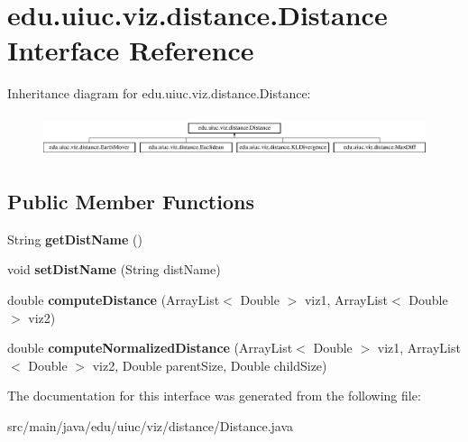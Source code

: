 \hypertarget{interfaceedu_1_1uiuc_1_1viz_1_1distance_1_1_distance}{}\section{edu.\+uiuc.\+viz.\+distance.\+Distance Interface Reference}
\label{interfaceedu_1_1uiuc_1_1viz_1_1distance_1_1_distance}
Inheritance diagram for edu.\+uiuc.\+viz.\+distance.\+Distance\+:\begin{figure}[H]
\begin{center}
\leavevmode
\includegraphics[height=1.244444cm]{interfaceedu_1_1uiuc_1_1viz_1_1distance_1_1_distance}
\end{center}
\end{figure}
\subsection*{Public Member Functions}
\begin{DoxyCompactItemize}
\item 
\mbox{\label{interfaceedu_1_1uiuc_1_1viz_1_1distance_1_1_distance_a31ea5f00d277c4878eed1290e2b740d9}} 
String {\bfseries get\+Dist\+Name} ()
\item 
\mbox{\label{interfaceedu_1_1uiuc_1_1viz_1_1distance_1_1_distance_a518598e720285f309bf28826601439ae}} 
void {\bfseries set\+Dist\+Name} (String dist\+Name)
\item 
\mbox{\label{interfaceedu_1_1uiuc_1_1viz_1_1distance_1_1_distance_a4221df5969873dddb0c7c115c03a1f17}} 
double {\bfseries compute\+Distance} (Array\+List$<$ Double $>$ viz1, Array\+List$<$ Double $>$ viz2)
\item 
\mbox{\label{interfaceedu_1_1uiuc_1_1viz_1_1distance_1_1_distance_a132afaa63a6f52036dda2fabb5a239b4}} 
double {\bfseries compute\+Normalized\+Distance} (Array\+List$<$ Double $>$ viz1, Array\+List$<$ Double $>$ viz2, Double parent\+Size, Double child\+Size)
\end{DoxyCompactItemize}


The documentation for this interface was generated from the following file\+:\begin{DoxyCompactItemize}
\item 
src/main/java/edu/uiuc/viz/distance/Distance.\+java\end{DoxyCompactItemize}
